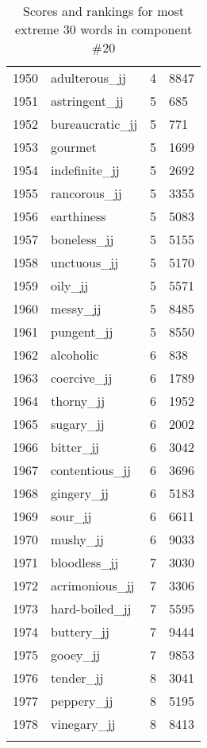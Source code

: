 \begin{longtable}[!htbp]{| rlr@{.}l |}
    1950 & adulterous\_jj & 4 & 8847 \\
    1951 & astringent\_jj & 5 & 685 \\
    1952 & bureaucratic\_jj & 5 & 771 \\
    1953 & gourmet & 5 & 1699 \\
    1954 & indefinite\_jj & 5 & 2692 \\
    1955 & rancorous\_jj & 5 & 3355 \\
    1956 & earthiness & 5 & 5083 \\
    1957 & boneless\_jj & 5 & 5155 \\
    1958 & unctuous\_jj & 5 & 5170 \\
    1959 & oily\_jj & 5 & 5571 \\
    1960 & messy\_jj & 5 & 8485 \\
    1961 & pungent\_jj & 5 & 8550 \\
    1962 & alcoholic & 6 & 838 \\
    1963 & coercive\_jj & 6 & 1789 \\
    1964 & thorny\_jj & 6 & 1952 \\
    1965 & sugary\_jj & 6 & 2002 \\
    1966 & bitter\_jj & 6 & 3042 \\
    1967 & contentious\_jj & 6 & 3696 \\
    1968 & gingery\_jj & 6 & 5183 \\
    1969 & sour\_jj & 6 & 6611 \\
    1970 & mushy\_jj & 6 & 9033 \\
    1971 & bloodless\_jj & 7 & 3030 \\
    1972 & acrimonious\_jj & 7 & 3306 \\
    1973 & hard-boiled\_jj & 7 & 5595 \\
    1974 & buttery\_jj & 7 & 9444 \\
    1975 & gooey\_jj & 7 & 9853 \\
    1976 & tender\_jj & 8 & 3041 \\
    1977 & peppery\_jj & 8 & 5195 \\
    1978 & vinegary\_jj & 8 & 8413 \\
    \hline
    \caption{Scores and rankings for most extreme 30 words in component \#20} \\
\end{longtable}

